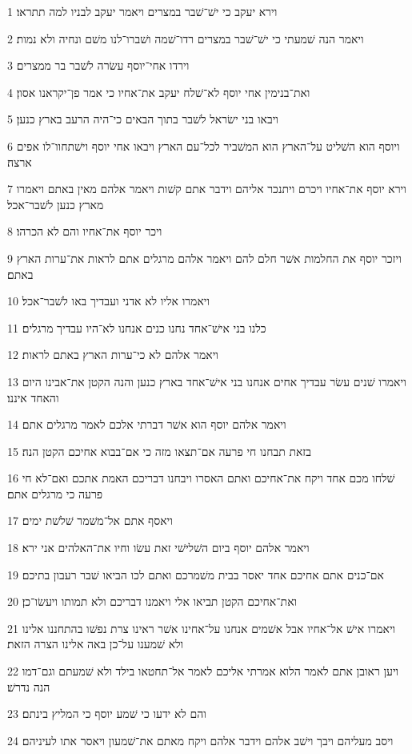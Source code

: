 \par 1 וירא יעקב כי ישׁ־שׁבר במצרים ויאמר יעקב לבניו למה תתראו׃
\par 2 ויאמר הנה שׁמעתי כי ישׁ־שׁבר במצרים רדו־שׁמה ושׁברו־לנו משׁם ונחיה ולא נמות׃
\par 3 וירדו אחי־יוסף עשׂרה לשׁבר בר ממצרים׃
\par 4 ואת־בנימין אחי יוסף לא־שׁלח יעקב את־אחיו כי אמר פן־יקראנו אסון׃
\par 5 ויבאו בני ישׂראל לשׁבר בתוך הבאים כי־היה הרעב בארץ כנען׃
\par 6 ויוסף הוא השׁליט על־הארץ הוא המשׁביר לכל־עם הארץ ויבאו אחי יוסף וישׁתחוו־לו אפים ארצה׃
\par 7 וירא יוסף את־אחיו ויכרם ויתנכר אליהם וידבר אתם קשׁות ויאמר אלהם מאין באתם ויאמרו מארץ כנען לשׁבר־אכל׃
\par 8 ויכר יוסף את־אחיו והם לא הכרהו׃
\par 9 ויזכר יוסף את החלמות אשׁר חלם להם ויאמר אלהם מרגלים אתם לראות את־ערות הארץ באתם׃
\par 10 ויאמרו אליו לא אדני ועבדיך באו לשׁבר־אכל׃
\par 11 כלנו בני אישׁ־אחד נחנו כנים אנחנו לא־היו עבדיך מרגלים׃
\par 12 ויאמר אלהם לא כי־ערות הארץ באתם לראות׃
\par 13 ויאמרו שׁנים עשׂר עבדיך אחים אנחנו בני אישׁ־אחד בארץ כנען והנה הקטן את־אבינו היום והאחד איננו׃
\par 14 ויאמר אלהם יוסף הוא אשׁר דברתי אלכם לאמר מרגלים אתם׃
\par 15 בזאת תבחנו חי פרעה אם־תצאו מזה כי אם־בבוא אחיכם הקטן הנה׃
\par 16 שׁלחו מכם אחד ויקח את־אחיכם ואתם האסרו ויבחנו דבריכם האמת אתכם ואם־לא חי פרעה כי מרגלים אתם׃
\par 17 ויאסף אתם אל־משׁמר שׁלשׁת ימים׃
\par 18 ויאמר אלהם יוסף ביום השׁלישׁי זאת עשׂו וחיו את־האלהים אני ירא׃
\par 19 אם־כנים אתם אחיכם אחד יאסר בבית משׁמרכם ואתם לכו הביאו שׁבר רעבון בתיכם׃
\par 20 ואת־אחיכם הקטן תביאו אלי ויאמנו דבריכם ולא תמותו ויעשׂו־כן׃
\par 21 ויאמרו אישׁ אל־אחיו אבל אשׁמים אנחנו על־אחינו אשׁר ראינו צרת נפשׁו בהתחננו אלינו ולא שׁמענו על־כן באה אלינו הצרה הזאת׃
\par 22 ויען ראובן אתם לאמר הלוא אמרתי אליכם לאמר אל־תחטאו בילד ולא שׁמעתם וגם־דמו הנה נדרשׁ׃
\par 23 והם לא ידעו כי שׁמע יוסף כי המליץ בינתם׃
\par 24 ויסב מעליהם ויבך וישׁב אלהם וידבר אלהם ויקח מאתם את־שׁמעון ויאסר אתו לעיניהם׃
